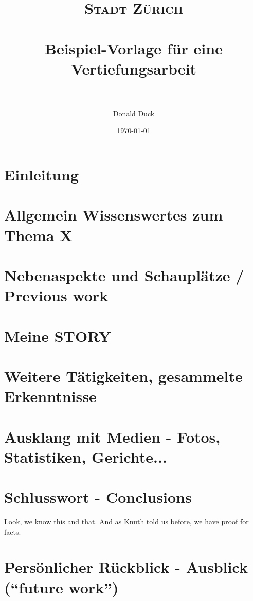\documentclass[paper=a4, fontsize=11pt]{scrartcl}
\title{
    \normalfont \normalsize
    \textsc{Stadt Zürich} \\ [25pt]
    \horrule{0.5pt} \\[0.4cm] %
    \huge Beispiel-Vorlage für eine Vertiefungsarbeit \\ %
    \horrule{2pt} \\[0.5cm] %
}
\author{Donald Duck}
\date{\normalsize\today}
\numberwithin{equation}{section} %
\numberwithin{table}{section} %
\begin{document}
\maketitle %
\thispagestyle{empty}
\newpage
\tableofcontents
\thispagestyle{empty}
\newpage

\section{Einleitung}
\lipsum[1] %

\section{Allgemein Wissenswertes zum Thema X}
\lipsum[2-4] %

\section{Nebenaspekte und Schauplätze / Previous work}
\lipsum[5-6] %

\section{Meine STORY}
\lipsum[7-11] %

\section{Weitere Tätigkeiten, gesammelte Erkenntnisse}
\lipsum[12-13] %

\section{Ausklang mit Medien - Fotos, Statistiken, Gerichte...}
\lipsum[14-17] %

\section{Schlusswort - Conclusions}
\lipsum[18] %
Look, we know this\citep{DBLP:books/aw/Knuth73} and that.
And as Knuth told us before\citep{DBLP:books/daglib/0030428},
we have proof for facts\citep{DBLP:journals/cacm/KnuthS21}.

\section{Persönlicher Rückblick - Ausblick (``future work'')}
\lipsum[19] %
\end{document}

